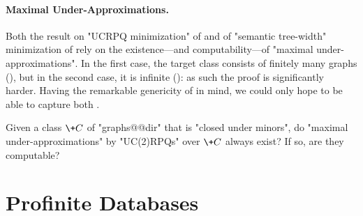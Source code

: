 \paragraph*{Maximal Under-Approximations.}
Both the result on "UCRPQ minimization" of 
and of "semantic tree-width" minimization of  
rely on the existence---and computability---of "maximal under-approximations".
In the first case, the target class consists of finitely many graphs (), but in the second case,
it is infinite (): as such the proof is significantly harder.
Having the remarkable genericity of  in mind,
we could only hope to be able to capture 
both .

\begin{question}
	Given a class $\+C$ of "graphs@@dir" that is "closed under minors",
	do "maximal under-approximations" by "UC(2)RPQs" over $\+C$ always exist?
	If so, are they computable?
\end{question}

\section{Profinite Databases}


